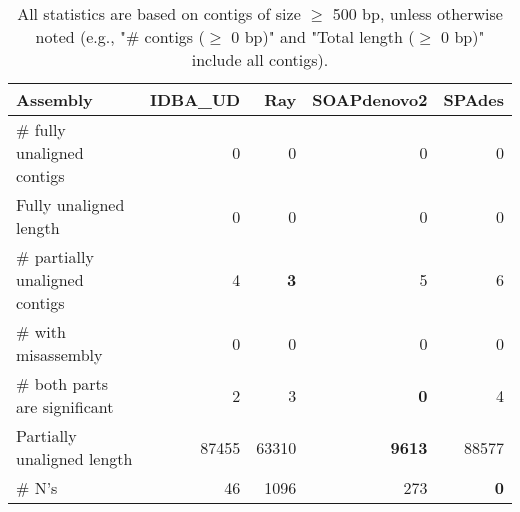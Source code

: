 \documentclass[12pt,a4paper]{article}
\begin{document}
\begin{table}[ht]
\begin{center}
\caption{All statistics are based on contigs of size $\geq$ 500 bp, unless otherwise noted (e.g., "\# contigs ($\geq$ 0 bp)" and "Total length ($\geq$ 0 bp)" include all contigs).}
\begin{tabular}{|l*{4}{|r}|}
\hline
Assembly & IDBA\_UD & Ray & SOAPdenovo2 & SPAdes \\ \hline
\# fully unaligned contigs & 0 & 0 & 0 & 0 \\ \hline
Fully unaligned length & 0 & 0 & 0 & 0 \\ \hline
\# partially unaligned contigs & 4 & {\bf 3} & 5 & 6 \\ \hline
\hspace{5mm}\# with misassembly & 0 & 0 & 0 & 0 \\ \hline
\hspace{5mm}\# both parts are significant & 2 & 3 & {\bf 0} & 4 \\ \hline
Partially unaligned length & 87455 & 63310 & {\bf 9613} & 88577 \\ \hline
\# N's & 46 & 1096 & 273 & {\bf 0} \\ \hline
\end{tabular}
\end{center}
\end{table}
\end{document}
